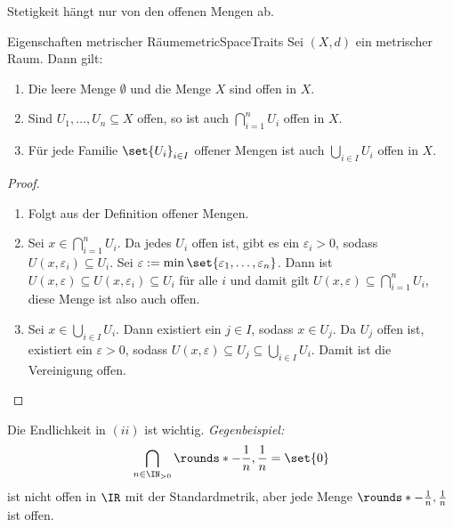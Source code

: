 \documentclass[language=ngerman]{TemplateLecture} %
\begin{document}

\begin{corollary}
    Stetigkeit hängt nur von den offenen Mengen ab.
\end{corollary}

\begin{lem}{Eigenschaften metrischer Räume}{metricSpaceTraits}
    Sei $(X,d)$ ein metrischer Raum. Dann gilt:
    \begin{enumerate}[$(i)$]
        \item Die leere Menge $\emptyset$ und die Menge $X$ sind offen in $X$.
        \item Sind $U_1, \dots, U_n \subseteq X$ offen, so ist auch $\bigcap_{i = 1}^n U_i$ offen in $X$.
        \item Für jede Familie $\set{U_i}_{i \in I}$ offener Mengen ist auch $\bigcup_{i \in I} U_i$ offen in $X$.
    \end{enumerate}
\end{lem}

\begin{proof}
    \begin{enumerate}[$(i)$]
        \item Folgt aus der Definition offener Mengen.
        \item Sei $x \in \bigcap_{i = 1}^n U_i$. Da jedes $U_i$ offen ist, gibt es ein $\varepsilon_i > 0$, sodass $U(x, \varepsilon_i) \subseteq U_i$. Sei $\varepsilon := \min\set{\varepsilon_1, \dots, \varepsilon_n}$. Dann ist $U(x, \varepsilon) \subseteq U(x, \varepsilon_i) \subseteq U_i$ für alle $i$ und damit gilt $U(x, \varepsilon) \subseteq \bigcap_{i = 1}^n U_i$, diese Menge ist also auch offen.
        \item Sei $x \in \bigcup_{i \in I} U_i$. Dann existiert ein $j \in I$, sodass $x \in U_j$. Da $U_j$ offen ist, existiert ein $\varepsilon > 0$, sodass $U(x, \varepsilon) \subseteq U_j \subseteq \bigcup_{i \in I} U_i$. Damit ist die Vereinigung offen.
    \end{enumerate}
\end{proof}

\begin{remark}
    Die Endlichkeit in $(ii)$ ist wichtig. \emph{Gegenbeispiel:} 
    \begin{equation*}
        \bigcap_{n \in \IN_{>0}} \rounds*{-\frac{1}{n}, \frac{1}{n}} = \set{0}
    \end{equation*}
    ist nicht offen in $\IR$ mit der Standardmetrik, aber jede Menge $\rounds*{-\frac{1}{n},\frac{1}{n}}$ ist offen.
\end{remark}
\end{document}
